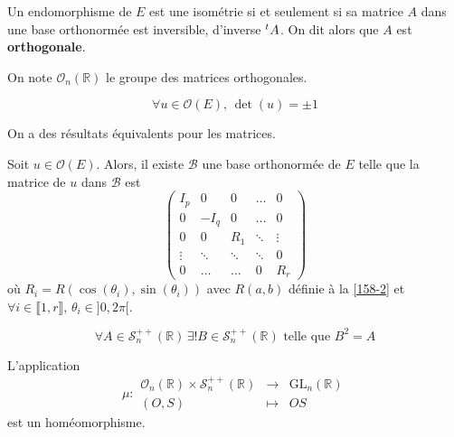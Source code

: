   \begin{theorem}
    Un endomorphisme de $E$ est une isométrie si et seulement si sa matrice $A$ dans une base orthonormée est inversible, d'inverse $\mathstrut ^t A$.
    \newpar
    On dit alors que $A$ est \textbf{orthogonale}.
  \end{theorem}

  \begin{notation}
    On note $\mathcal{O}_n(\mathbb{R})$ le groupe des matrices orthogonales.
  \end{notation}

  \begin{theorem}
    \[ \forall u \in \mathcal{O}(E), \, \det(u) = \pm 1 \]
  \end{theorem}

  \begin{remark}
    On a des résultats équivalents pour les matrices.
  \end{remark}

  \begin{theorem}
    Soit $u \in \mathcal{O}(E)$. Alors, il existe $\mathcal{B}$ une base orthonormée de $E$ telle que la matrice de $u$ dans $\mathcal{B}$ est
    \[ \begin{pmatrix} I_p & 0 & 0 & \dots & 0 \\ 0 & -I_q & 0 & \dots & 0 \\ 0 & 0 & R_1 & \ddots & \vdots \\ \vdots & \ddots & \ddots & \ddots & 0 \\ 0 & \dots & \dots & 0 & R_r \end{pmatrix} \]
    où $R_i = R(\cos(\theta_i), \sin(\theta_i))$ avec $R(a,b)$ définie à la \cref{158-2} et $\forall i \in \llbracket 1, r \rrbracket, \, \theta_i \in ]0,2\pi[$.
  \end{theorem}


  \begin{lemma}
    \[ \forall A \in \mathcal{S}_n^{++}(\mathbb{R}) \, \exists! B \in \mathcal{S}_n^{++}(\mathbb{R}) \text{ telle que } B^2 = A \]
  \end{lemma}


  \begin{theorem}
    L'application
    \[ \mu :
    \begin{array}{ccc}
      \mathcal{O}_n(\mathbb{R}) \times \mathcal{S}_n^{++}(\mathbb{R}) &\rightarrow& \mathrm{GL}_n(\mathbb{R}) \\
      (O, S) &\mapsto& OS
    \end{array}
    \]
    est un homéomorphisme.
  \end{theorem}

